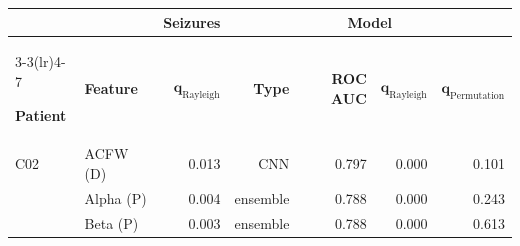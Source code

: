 \begin{tabular}{llrrrrr}
    \toprule
     &  & \textbf{Seizures} & \multicolumn{4}{c}{\textbf{Model}} \\
        \cmidrule(lr){3-3}\cmidrule(lr){4-7}

    \textbf{Patient} & \textbf{Feature}  & $\boldsymbol{q_{\mathrm{Rayleigh}}}$ & \textbf{Type} & \textbf{ROC AUC} & $\boldsymbol{q_{\mathrm{Rayleigh}}}$ & $\boldsymbol{q_{\mathrm{Permutation}}}$ \\
    \midrule

    \rowcolor{white}C02 & ACFW (D) & 0.013 & CNN & 0.797 & 0.000 & 0.101 \\
    \rowcolor{gray!20}\multirow[t]{2}{*}{U17} & Alpha (P) & 0.004 & ensemble & 0.788 & 0.000 & 0.243 \\
    \rowcolor{gray!20} & Beta (P) & 0.003 & ensemble & 0.788 & 0.000 & 0.613 \\

    \bottomrule
\end{tabular}
